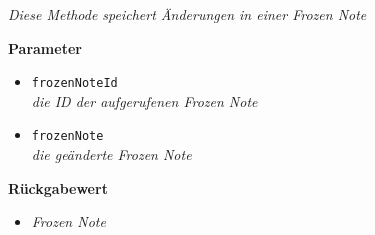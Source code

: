 \begin{itemize}
		\textit{Diese Methode speichert Änderungen in einer Frozen Note}

		\textbf{Parameter} 
			\begin{itemize}
				\item\texttt{frozenNoteId}\\
		 		\textit{die ID der aufgerufenen Frozen Note }
		 		\item\texttt{frozenNote}\\
		 		\textit{die geänderte Frozen Note}
	 		\end{itemize}

		\textbf{Rückgabewert} 
		\begin{itemize}
		\item\textit{Frozen Note}
		\end{itemize}

	 \end{itemize}



